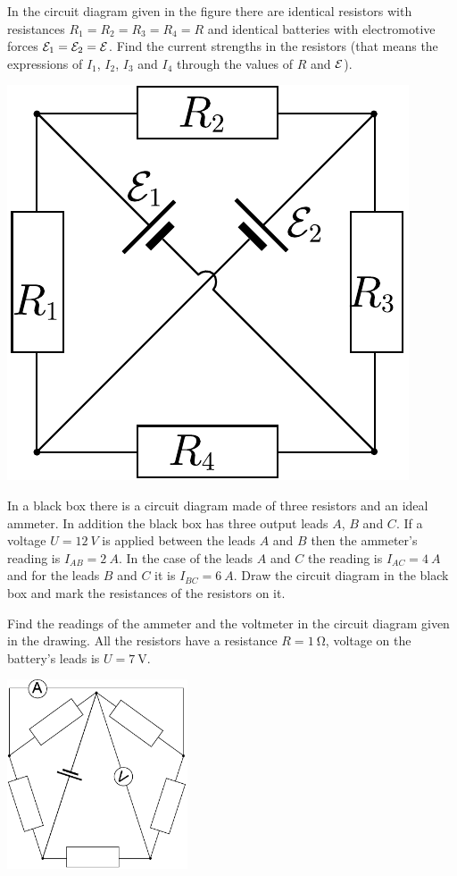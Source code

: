 \documentclass[11pt]{article}
\begin{document}

\probeng
In the circuit diagram given in the figure there are identical resistors with resistances $R_1 = R_2 = R_3 = R_4 = R$ and identical batteries with electromotive forces ${\cal E}_1 = {\cal E}_2
= {\cal E}$. Find the current strengths in the resistors (that means the expressions of $I_1$, $I_2$, $I_3$ and $I_4$ through the values of $R$ and ${\cal E}$).
\begin{center}
\includegraphics[width=0.35\linewidth]{2012-v3g-03-elektriline_sild}%
\end{center}
\probend
\bigskip


\probeng
In a black box there is a circuit diagram made of three resistors and an ideal ammeter. In addition the black box has three output leads $A$, $B$ and $C$. If a voltage $U=\SI{12}{V}$ is applied between the leads $A$ and $B$ then the ammeter’s reading is $I_{AB}=\SI{2}{A}$. In the case of the leads $A$ and $C$ the reading is $I_{AC}=\SI{4}{A}$ and for the leads $B$ and $C$ it is $I_{BC}=\SI{6}{A}$. Draw the circuit diagram in the black box and mark the resistances of the resistors on it.
\probend
\bigskip


\probeng
Find the readings of the ammeter and the voltmeter in the circuit diagram given in the drawing. All the resistors have a resistance $R=\SI{1}{\ohm}$, voltage on the battery’s leads is $U=\SI{7}{\volt}$. 
\begin{center}
	\includegraphics[width=0.4\textwidth]{2017-v3g-06-viisnurk}
\end{center}
\probend
\bigskip
\end{document}
